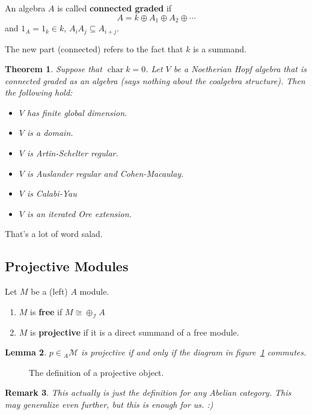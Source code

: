 \documentclass[12pt]{article}
\theoremstyle{break}
\theoremstyle{nonumberbreak}
\theoremstyle{changebreak}
\newtheorem{thm}{Theorem}[subsection]
\newtheorem{lem}[thm]{Lemma}
\theoremstyle{break}
\theoremstyle{nonumberbreak}
\theoremstyle{nonumberplain}
\theoremstyle{change}
\newtheorem{rmk}[thm]{Remark}
\DeclareMathOperator{\ch}{char}
\begin{document}
\begin{defn}
	An algebra $A$ is called \textbf{connected graded} if 
	\[A=k\oplus A_1\oplus A_2\oplus \cdots\]
	and $1_A=1_k\in k$, $A_iA_j\subseteq A_{i+j}$. 

	The new part (connected) refers to the fact that $k$ is a summand.
\end{defn}
\begin{thm}
	Suppose that $\ch k=0$. Let $V$ be a Noetherian Hopf algebra that is connected graded as an algebra (says nothing about the coalgebra structure).
	Then the following hold:
	\begin{itemize}
		\item $V$ has finite global dimension.
		\item $V$ is a domain.
		\item $V$ is Artin-Schelter regular.
		\item $V$ is Auslander regular and Cohen-Macaulay.
		\item $V$ is Calabi-Yau
		\item $V$ is an iterated Ore extension.
	\end{itemize}
\end{thm}
That's a lot of word salad.

\subsection{Projective Modules}
\begin{defn}
	Let $M$ be a (left) $A$ module. 
	\begin{enumerate}
		\item $M$ is \textbf{free} if $M\cong \oplus_\mathcal{I} A$
		\item $M$ is \textbf{projective} if it is a direct summand of a free module.
	\end{enumerate}
\end{defn}
\begin{lem}
	$p\in{_A\mathscr{M}}$ is projective if and only if the diagram in figure~\ref{fig-proj2} commutes.
\end{lem}
\begin{figure}[h]
	\centering
	\caption{The definition of a projective object.}
	\label{fig-proj2}
\end{figure}
\begin{rmk}
	This actually is just the definition for any Abelian category. This may generalize even further, but this is enough for us. :)
\end{rmk}
\end{document}

